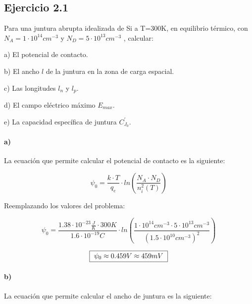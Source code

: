 \documentclass[../main.tex]{subfiles}
\begin{document}
	
	\subsection{Ejercicio 2.1}

	Para una juntura abrupta idealizada de Si a T=300K, en equilibrio térmico, con $N_A = 1 \cdot 10^{14} cm^{-3}$  y  $N_D = 5 \cdot 10^{13} cm^{-3}$ , calcular:
	
		a) El potencial de contacto.
		
		b) El ancho  $l$  de la juntura en la zona de carga espacial.
		
		c) Las longitudes $l_n$ y $l_p$.
		
		d) El campo eléctrico máximo $E_{max}$.
		
		e) La capacidad específica de juntura $C^{'}_{J_0}$.
	
	\bigskip
	
	\paragraph{a)}
		
	La ecuación que permite calcular el potencial de contacto es la siguiente:
	
	\begin{equation}
		\psi_0 = \frac{k \cdot T}{q_e} \cdot ln \left( \frac{N_A \cdot N_D}{n_i^2(T)}\right) 
	\end{equation} 
	
	Reemplazando los valores del problema:
	
	\begin{equation}
		\psi_0 = \frac{1.38 \cdot 10^{-23} \frac{J}{K} \cdot 300 K}{1.6 \cdot 10^{-19} C} \cdot ln \left( \frac{1 \cdot 10^{14} cm^{-3} \cdot 5 \cdot 10^{13} cm^{-3}}{{\left( 1.5 \cdot 10^{10} cm^{-3}\right) }^2}\right) 
	\end{equation} 
	
	\begin{equation}
		\fbox{
			$\psi_0 \approx 0.459 V \approx 459 mV$
			}
	\end{equation} 
	
	\paragraph{b)}
	
	La ecuación que permite calcular el ancho de juntura es la siguiente:
	
	
	
	
\end{document}
